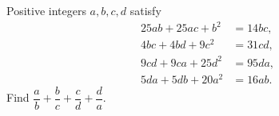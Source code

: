 Positive integers $a,b,c,d$ satisfy
\[
\begin{aligned}
25ab+25ac+b^2&=14bc,\\
4bc+4bd+9c^2&=31cd,\\
9cd+9ca+25d^2&=95da,\\
5da+5db+20a^2&=16ab.
\end{aligned}
\]
Find $\dfrac{a}{b}+\dfrac{b}{c}+\dfrac{c}{d}+\dfrac{d}{a}$.
